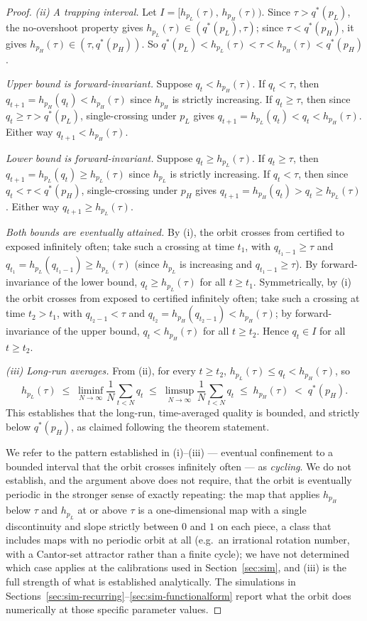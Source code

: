 \begin{proof}
\emph{(ii) A trapping interval.} Let $I=[h_{p_L}(\tau),\,h_{p_H}(\tau))$. Since $\tau>q^*(p_L)$, the no-overshoot property gives $h_{p_L}(\tau)\in(q^*(p_L),\tau)$; since $\tau<q^*(p_H)$, it gives $h_{p_H}(\tau)\in(\tau,q^*(p_H))$. So $q^*(p_L)<h_{p_L}(\tau)<\tau<h_{p_H}(\tau)<q^*(p_H)$.

\emph{Upper bound is forward-invariant.} Suppose $q_t<h_{p_H}(\tau)$. If $q_t<\tau$, then $q_{t+1}=h_{p_H}(q_t)<h_{p_H}(\tau)$ since $h_{p_H}$ is strictly increasing. If $q_t\geq\tau$, then since $q_t\geq\tau>q^*(p_L)$, single-crossing under $p_L$ gives $q_{t+1}=h_{p_L}(q_t)<q_t<h_{p_H}(\tau)$. Either way $q_{t+1}<h_{p_H}(\tau)$.

\emph{Lower bound is forward-invariant.} Suppose $q_t\geq h_{p_L}(\tau)$. If $q_t\geq\tau$, then $q_{t+1}=h_{p_L}(q_t)\geq h_{p_L}(\tau)$ since $h_{p_L}$ is strictly increasing. If $q_t<\tau$, then since $q_t<\tau<q^*(p_H)$, single-crossing under $p_H$ gives $q_{t+1}=h_{p_H}(q_t)>q_t\geq h_{p_L}(\tau)$. Either way $q_{t+1}\geq h_{p_L}(\tau)$.

\emph{Both bounds are eventually attained.} By (i), the orbit crosses from certified to exposed infinitely often; take such a crossing at time $t_1$, with $q_{t_1-1}\geq\tau$ and $q_{t_1}=h_{p_L}(q_{t_1-1})\geq h_{p_L}(\tau)$ (since $h_{p_L}$ is increasing and $q_{t_1-1}\geq\tau$). By forward-invariance of the lower bound, $q_t\geq h_{p_L}(\tau)$ for all $t\geq t_1$. Symmetrically, by (i) the orbit crosses from exposed to certified infinitely often; take such a crossing at time $t_2>t_1$, with $q_{t_2-1}<\tau$ and $q_{t_2}=h_{p_H}(q_{t_2-1})<h_{p_H}(\tau)$; by forward-invariance of the upper bound, $q_t<h_{p_H}(\tau)$ for all $t\geq t_2$. Hence $q_t\in I$ for all $t\geq t_2$.

\emph{(iii) Long-run averages.} From (ii), for every $t\geq t_2$, $h_{p_L}(\tau)\leq q_t<h_{p_H}(\tau)$, so
\[
h_{p_L}(\tau) \;\leq\; \liminf_{N\to\infty}\frac1N\sum_{t<N}q_t \;\leq\; \limsup_{N\to\infty}\frac1N\sum_{t<N}q_t \;\leq\; h_{p_H}(\tau) \;<\; q^*(p_H).
\]
This establishes that the long-run, time-averaged quality is bounded, and strictly below $q^*(p_H)$, as claimed following the theorem statement.

We refer to the pattern established in (i)--(iii) — eventual confinement to a bounded interval that the orbit crosses infinitely often — as \emph{cycling}. We do not establish, and the argument above does not require, that the orbit is eventually periodic in the stronger sense of exactly repeating: the map that applies $h_{p_H}$ below $\tau$ and $h_{p_L}$ at or above $\tau$ is a one-dimensional map with a single discontinuity and slope strictly between $0$ and $1$ on each piece, a class that includes maps with no periodic orbit at all (e.g.\ an irrational rotation number, with a Cantor-set attractor rather than a finite cycle); we have not determined which case applies at the calibrations used in Section~\ref{sec:sim}, and (iii) is the full strength of what is established analytically. The simulations in Sections~\ref{sec:sim-recurring}--\ref{sec:sim-functionalform} report what the orbit does numerically at those specific parameter values.


\end{proof}
